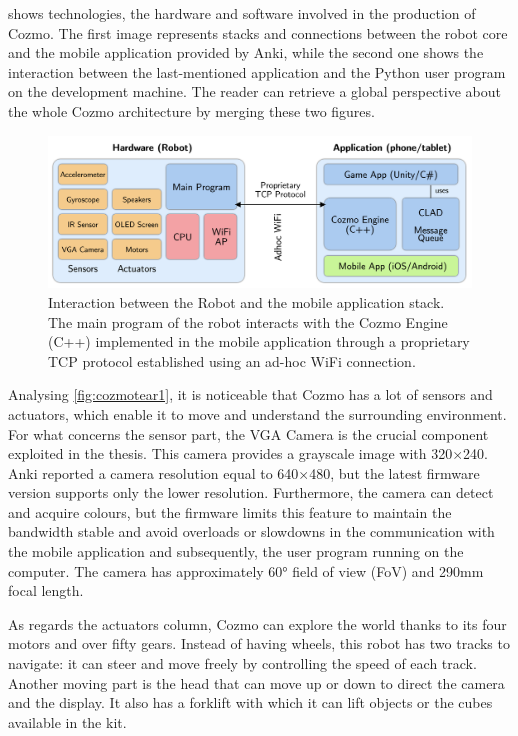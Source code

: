  shows technologies, the hardware and software involved in the production of Cozmo.
The first image represents stacks and connections between the robot core and the mobile application provided by Anki, while the second one shows the interaction between the last-mentioned application and the Python user program on the development machine.
The reader can retrieve a global perspective about the whole Cozmo architecture by merging these two figures.

\begin{figure}
	\centering
	\includegraphics[width=\textwidth]{img/cozmo-hw.png}
	\caption[Interaction Robot / Mobile Application]{Interaction between the Robot and the mobile application stack.
The main program of the robot interacts with the Cozmo Engine (C++) implemented in the mobile application through a proprietary TCP protocol established using an ad-hoc WiFi connection.
\cite{mellon2017cognitive}}
	\label{fig:cozmotear1}
\end{figure}

Analysing \vref{fig:cozmotear1}, it is noticeable that Cozmo has a lot of sensors and actuators, which enable it to move and understand the surrounding environment.
For what concerns the sensor part, the VGA Camera is the crucial component exploited in the thesis.
This camera provides a grayscale image with 320$\times$240.
Anki reported a camera resolution equal to 640$\times$480, but the latest firmware version supports only the lower resolution.
Furthermore, the camera can detect and acquire colours, but the firmware limits this feature to maintain the bandwidth stable and avoid overloads or slowdowns in the communication with the mobile application and subsequently, the user program running on the computer.
The camera has approximately 60° field of view (FoV) and 290mm focal length.

As regards the actuators column, Cozmo can explore the world thanks to its four motors and over fifty gears.
Instead of having wheels, this robot has two tracks to navigate: it can steer and move freely by controlling the speed of each track.
Another moving part is the head that can move up or down to direct the camera and the display.
It also has a forklift with which it can lift objects or the cubes available in the kit.

